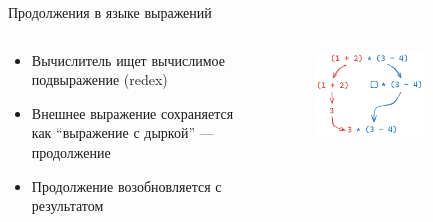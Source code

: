     \begin{frame}[fragile]{Продолжения в языке выражений}
        \vspace{-1em}
        \begin{columns}[onlytextwidth]
            \begin{column}{0.465\textwidth}
                \begin{itemize}
                    \item Вычислитель ищет вычислимое подвыражение (redex)
                    \item Внешнее выражение сохраняется как ``выражение с дыркой'' --- продолжение
                    \item Продолжение возобновляется с результатом
                \end{itemize}
            \end{column}%
            \begin{column}{0.55\textwidth}
                \begin{figure}[h]
                    \centering
                    \includegraphics[width=0.7\textwidth]{figs/cont-expr}
                \end{figure}
            \end{column}
        \end{columns}
    \end{frame}

